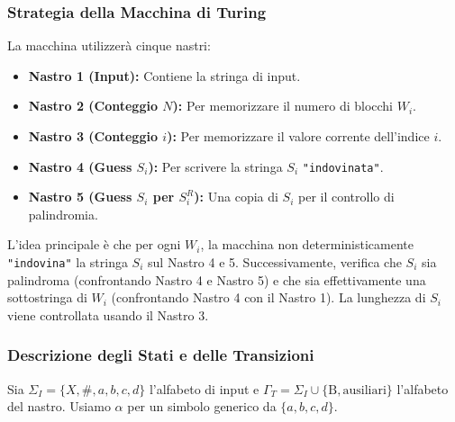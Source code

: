 \documentclass[a4paper]{article}
\newcommand{\B}{\text{B}} %
\begin{document}
\subsubsection{Strategia della Macchina di Turing}
La macchina utilizzerà cinque nastri:
\begin{itemize}
    \item \textbf{Nastro 1 (Input):} Contiene la stringa di input.
    \item \textbf{Nastro 2 (Conteggio $N$):} Per memorizzare il numero di blocchi $W_i$.
    \item \textbf{Nastro 3 (Conteggio $i$):} Per memorizzare il valore corrente dell'indice $i$.
    \item \textbf{Nastro 4 (Guess $S_i$):} Per scrivere la stringa $S_i$ \texttt{"indovinata"}.
    \item \textbf{Nastro 5 (Guess $S_i$ per $S_i^R$):} Una copia di $S_i$ per il controllo di palindromia.
\end{itemize}

L'idea principale è che per ogni $W_i$, la macchina non deterministicamente \texttt{"indovina"} la stringa $S_i$ sul Nastro 4 e 5. Successivamente, verifica che $S_i$ sia palindroma (confrontando Nastro 4 e Nastro 5) e che sia effettivamente una sottostringa di $W_i$ (confrontando Nastro 4 con il Nastro 1). La lunghezza di $S_i$ viene controllata usando il Nastro 3.

\subsubsection{Descrizione degli Stati e delle Transizioni}
Sia $\Sigma_I = \{X, \#, a,b,c,d\}$ l'alfabeto di input e $\Gamma_T = \Sigma_I \cup \{\B, \text{ausiliari}\}$ l'alfabeto del nastro. Usiamo $\alpha$ per un simbolo generico da $\{a,b,c,d\}$.
\end{document}
